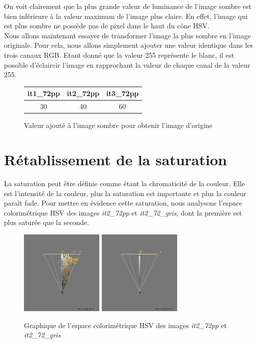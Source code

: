 \documentclass[a4paper,10pt]{article}
\begin{document}
On voit clairement que la plus grande valeur de luminance de l'image sombre est bien inférieure
à la valeur maximum de l'image plus claire. En effet, l'image qui est plus sombre ne possède pas de pixel dans le haut du cône HSV.\\

Nous allons maintenant essayer de transformer l'image la plus sombre en l'image originale. Pour cela,
nous allons simplement ajouter une valeur identique dans les trois canaux RGB. Etant donné que la valeur 255
représente le blanc, il est possible d'éclaircir l'image en rapprochant la valeur de chaque canal de la valeur 255.

\begin{figure}[!h]
	\begin{center}
	\begin{tabular}{|c|c|c|}
 		\hline
 		it1\_72pp & it2\_72pp & it3\_72pp\\
 		\hline
 		30 & 40 & 60\\
 		\hline
	\end{tabular}
	\caption{Valeur ajouté à l'image sombre pour obtenir l'image d'origine}
	\end{center}
\end{figure}



\section{Rétablissement de la saturation}
La saturation peut être définie comme étant la chromaticité de la couleur. Elle est l'intensité de la couleur, plus
la saturation est importante et plus la couleur paraît fade. Pour mettre en évidence cette saturation, nous analysons
l'espace colorimétrique HSV des images \textit{it2\_72pp} et \textit{it2\_72\_gris}, dont la première est plus saturée
que la seconde.\\

\begin{figure}[!h]
 \begin{center}
 \includegraphics[width=4cm]{resultat/saturation1.png}
 \includegraphics[width=4cm]{resultat/saturation2.png}
 \caption{Graphique de l'espace colorimétrique HSV des images \textit{it2\_72pp} et \textit{it2\_72\_gris}}
 \end{center}
\end{figure}
\end{document}
